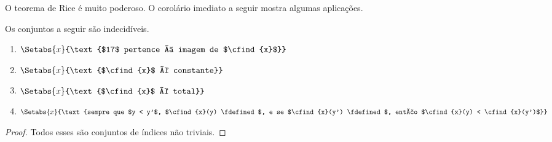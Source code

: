 \documentclass[../../../include/open-logic-section]{subfiles}
\begin{document}
O teorema de Rice é muito poderoso. O corolário imediato a seguir
mostra algumas aplicações.
\begin{cor}
Os conjuntos a seguir são indecidíveis.
\begin{enumerate}
\item $\Setabs{x}{\text{$17$ pertence à imagem de $\cfind{x}$}}$
\item $\Setabs{x}{\text{$\cfind{x}$ é constante}}$
\item $\Setabs{x}{\text{$\cfind{x}$ é total}}$
\item $\Setabs{x}{\text{sempre que $y < y'$, $\cfind{x}(y) \fdefined$, e
    se $\cfind{x}(y') \fdefined$, então $\cfind{x}(y) < \cfind{x}(y')$}}$
\end{enumerate}
\end{cor}

\begin{proof}
  Todos esses são conjuntos de índices não triviais.
\end{proof}
\end{document}
